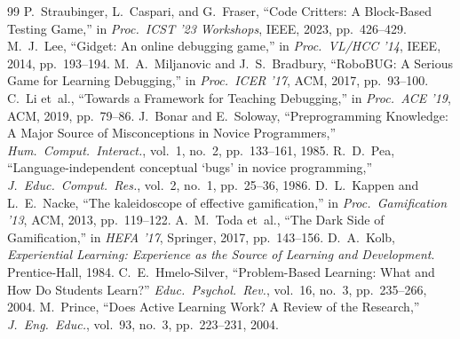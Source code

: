 \documentclass[conference]{IEEEtran}
\begin{document}
\begin{thebibliography}{99}
 P.~Straubinger, L.~Caspari, and G.~Fraser, ``Code Critters: A Block-Based Testing Game,'' in \emph{Proc.\ ICST '23 Workshops}, IEEE, 2023, pp.~426--429.
 M.~J.~Lee, ``Gidget: An online debugging game,'' in \emph{Proc.\ VL/HCC '14}, IEEE, 2014, pp.~193--194.
 M.~A.~Miljanovic and J.~S.~Bradbury, ``RoboBUG: A Serious Game for Learning Debugging,'' in \emph{Proc.\ ICER '17}, ACM, 2017, pp.~93--100.
 C.~Li et~al., ``Towards a Framework for Teaching Debugging,'' in \emph{Proc.\ ACE '19}, ACM, 2019, pp.~79--86.
 J.~Bonar and E.~Soloway, ``Preprogramming Knowledge: A Major Source of Misconceptions in Novice Programmers,'' \emph{Hum.\ Comput.\ Interact.}, vol.~1, no.~2, pp.~133--161, 1985.
 R.~D.~Pea, ``Language-independent conceptual `bugs' in novice programming,'' \emph{J.\ Educ.\ Comput.\ Res.}, vol.~2, no.~1, pp.~25--36, 1986.
 D.~L.~Kappen and L.~E.~Nacke, ``The kaleidoscope of effective gamification,'' in \emph{Proc.\ Gamification '13}, ACM, 2013, pp.~119--122.
 A.~M.~Toda et~al., ``The Dark Side of Gamification,'' in \emph{HEFA '17}, Springer, 2017, pp.~143--156.
 D.~A.~Kolb, \emph{Experiential Learning: Experience as the Source of Learning and Development}. Prentice-Hall, 1984.
 C.~E.~Hmelo-Silver, ``Problem-Based Learning: What and How Do Students Learn?'' \emph{Educ.\ Psychol.\ Rev.}, vol.~16, no.~3, pp.~235--266, 2004.
 M.~Prince, ``Does Active Learning Work? A Review of the Research,'' \emph{J.\ Eng.\ Educ.}, vol.~93, no.~3, pp.~223--231, 2004.
\end{thebibliography}
\end{document}
